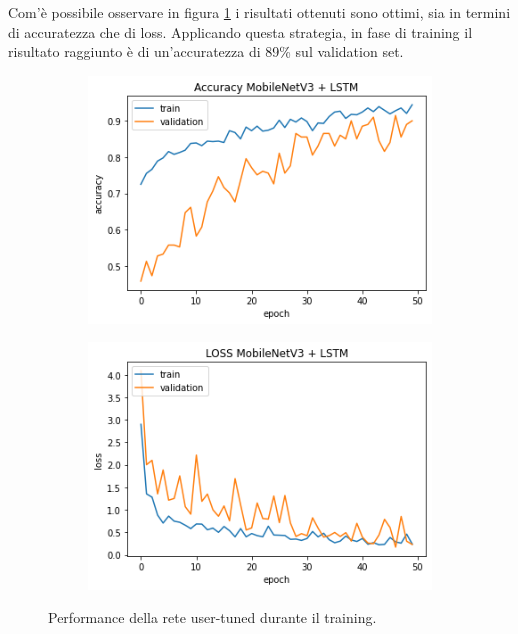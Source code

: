 \documentclass[11pt]{report}
\begin{document}
\vspace{0.5cm}

 Com'è possibile osservare in figura \ref{fig:train-user-tuning} i risultati ottenuti sono ottimi, sia in termini di accuratezza che di loss. Applicando questa strategia, in fase di training il risultato raggiunto è di un'accuratezza di 89\% sul validation set.

\vspace{0.5cm}

\begin{figure}[h]
\centering
	\begin{subfigure}[t]{.45\textwidth}
	\centering
    \includegraphics[scale = 0.5]{img/user-tuning-accuracy.png}
	\end{subfigure}
	\quad
	\begin{subfigure}[t]{.45\textwidth}
	\centering
    \includegraphics[scale = 0.5]{img/user-tuning-loss.png}
	\end{subfigure}
	\quad
\caption{Performance della rete user-tuned durante il training.}
\label{fig:train-user-tuning}
\end{figure}


\newpage
\end{document}
